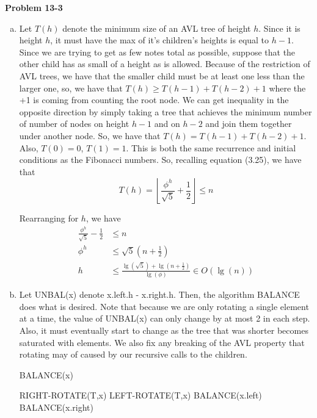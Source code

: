 \documentclass{article}
\begin{document}
\noindent\textbf{ Problem 13-3} \\

\begin{enumerate}[a.]
\item
Let $T(h)$ denote the minimum size of an AVL tree of height $h$.  Since it is height $h$, it must have the max of it's children's heights is equal to $h-1$. Since we are trying to get as few notes total as possible, suppose that the other child has as small of a height as is allowed. Because of the restriction of AVL trees, we have that the smaller child must be at least one less than the larger one, so, we have that $T(h) \ge T(h-1) + T(h-2) +1$ where the +1 is coming from counting the root node. We can get inequality in the opposite direction by simply taking a tree that achieves the minimum number of number of nodes on height $h-1$ and on $h-2$ and join them together under another node. So, we have that $T(h) = T(h-1)+T(h-2)+1$. Also, $T(0) = 0$, $T(1) = 1$. This is both the same recurrence and initial conditions as the Fibonacci numbers. So, recalling equation (3.25), we have that
\[
T(h) = \left\lfloor \frac{\phi^h}{\sqrt{5}} +\frac{1}{2} \right\rfloor \le n
\]

Rearranging for $h$, we have
\begin{align*}
\frac{\phi^h}{\sqrt{5}} -\frac{1}{2}  &\le n\\
\phi^h  &\le\sqrt{5}\left( n + \frac{1}{2} \right)\\
h &\le \frac{\lg(\sqrt{5}) + \lg(n + \frac{1}{2})}{\lg(\phi)} \in O(\lg(n))
\end{align*}

\item
Let UNBAL(x) denote x.left.h - x.right.h. Then, the algorithm BALANCE does what is desired. Note that because we are only rotating a single element at a time, the value of UNBAL(x) can only change by at most 2 in each step. Also, it must eventually start to change as the tree that was shorter becomes saturated with elements. We also fix any breaking of the AVL property that rotating may of caused by our recursive calls to the children.
\begin{algorithm}
\caption{BALANCE(x)}
\begin{algorithmic}
\State RIGHT-ROTATE(T,x)
\Else
\State LEFT-ROTATE(T,x)
\EndIf
\State BALANCE(x.left)
\State BALANCE(x.right)
\EndWhile
\end{algorithmic}
\end{algorithm}



\end{enumerate}
\end{document}
